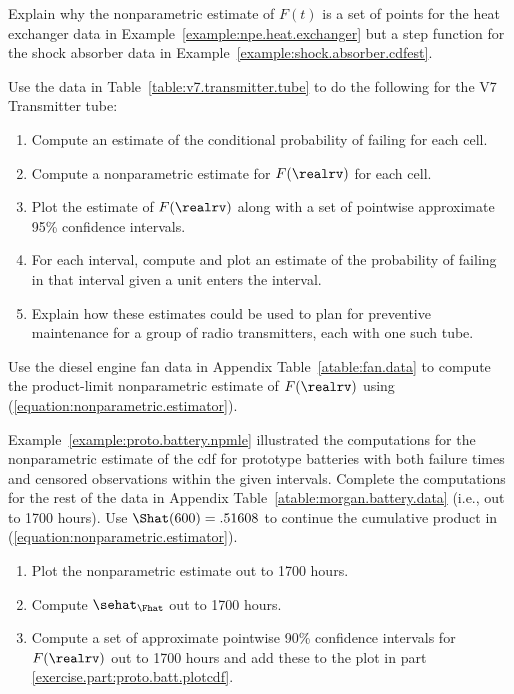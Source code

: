 \begin{exercise}
Explain why the nonparametric estimate of $F(t)$ is a set of points
for the heat exchanger data in
Example~\ref{example:npe.heat.exchanger} but a step function for the
shock absorber data in Example~\ref{example:shock.absorber.cdfest}.
\end{exercise}

\begin{exercise}
Use the data in Table~\ref{table:v7.transmitter.tube} to do the
following for the V7 Transmitter tube:
\begin{enumerate}
\item
Compute an estimate of the conditional probability of failing
for each cell.
\item
Compute a
nonparametric estimate for $F(\realrv)$ for each cell. 
\item
Plot the estimate of $F(\realrv)$ 
along with a set of pointwise approximate 95\% confidence
intervals.
\item
For each interval,
compute and plot an estimate of the probability of failing in that
interval given a unit enters the interval.
\item
Explain how these estimates could be used to plan for preventive
maintenance
for a group of radio transmitters, each with one such tube.
\end{enumerate}
\end{exercise}

\begin{exercise}
\label{exercise:fan.km}
Use the diesel engine fan data in Appendix
Table~\ref{atable:fan.data} to compute the product-limit nonparametric
estimate of $F(\realrv)$ using (\ref{equation:nonparametric.estimator}).
\end{exercise}


\begin{exercise}
Example~\ref{example:proto.battery.npmle} illustrated the
computations for the nonparametric estimate of the 
cdf for prototype batteries with both failure times and
censored observations within the given intervals.
Complete the computations for the rest
of the data in Appendix Table~\ref{atable:morgan.battery.data} (i.e., out to
1700 hours).
Use $\Shat(600)=.51608$ to continue the cumulative product 
in (\ref{equation:nonparametric.estimator}).
\begin{enumerate}
\item
\label{exercise.part:proto.batt.plotcdf}
Plot the nonparametric estimate out to 1700 hours.
\item
Compute $\sehat_{\Fhat}$ out to 1700 hours.
\item
Compute a set of approximate pointwise 90\% confidence intervals for
$F(\realrv)$ out to 1700 hours and add these to the plot in part
\ref{exercise.part:proto.batt.plotcdf}.
\end{enumerate}
\end{exercise}


